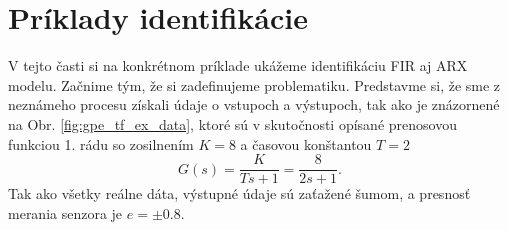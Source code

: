 \section{Príklady identifikácie}
V tejto časti si na konkrétnom príklade ukážeme identifikáciu FIR aj ARX modelu. Začnime tým, že si zadefinujeme problematiku. Predstavme si, že sme z neznámeho procesu získali údaje o vstupoch a výstupoch, tak ako je znázornené na Obr. \ref{fig:gpe_tf_ex_data}, ktoré sú v skutočnosti opísané prenosovou funkciou 1. rádu so zosilnením $ K = 8 $ a časovou konštantou $ T = 2 $
\begin{equation*}
	G(s) = \frac{K}{Ts + 1} = \frac{8}{2s + 1}.
\end{equation*}
Tak ako všetky reálne dáta, výstupné údaje sú zaťažené šumom, a presnosť merania senzora je $ e = \pm 0.8 $. 

